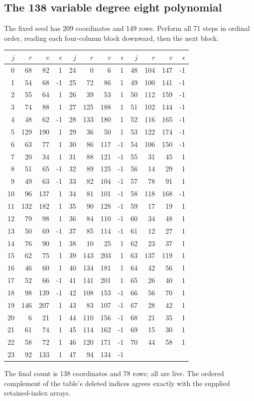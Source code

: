 \subsection{The 138 variable degree eight polynomial}
The fixed seed has 209 coordinates and 149 rows. Perform all 71 steps in ordinal order, reading each four-column block downward, then the next block.
\begin{center}\small\setlength{\tabcolsep}{5pt}
\begin{tabular}{@{}rrrr@{\quad}rrrr@{\quad}rrrr@{}}\toprule
$j$&$r$&$v$&$\epsilon$&$j$&$r$&$v$&$\epsilon$&$j$&$r$&$v$&$\epsilon$\\\midrule
0 & 68 & 82 & 1 & 24 & 0 & 6 & 1 & 48 & 104 & 147 & -1\\
1 & 54 & 68 & -1 & 25 & 72 & 86 & 1 & 49 & 100 & 141 & -1\\
2 & 55 & 64 & 1 & 26 & 39 & 53 & 1 & 50 & 112 & 159 & -1\\
3 & 74 & 88 & 1 & 27 & 125 & 188 & 1 & 51 & 102 & 144 & -1\\
4 & 48 & 62 & -1 & 28 & 133 & 180 & 1 & 52 & 116 & 165 & -1\\
5 & 129 & 190 & 1 & 29 & 36 & 50 & 1 & 53 & 122 & 174 & -1\\
6 & 63 & 77 & 1 & 30 & 86 & 117 & -1 & 54 & 106 & 150 & -1\\
7 & 20 & 34 & 1 & 31 & 88 & 121 & -1 & 55 & 31 & 45 & 1\\
8 & 51 & 65 & -1 & 32 & 89 & 125 & -1 & 56 & 14 & 29 & 1\\
9 & 49 & 63 & -1 & 33 & 82 & 104 & -1 & 57 & 78 & 91 & 1\\
10 & 96 & 137 & 1 & 34 & 81 & 101 & -1 & 58 & 118 & 168 & -1\\
11 & 132 & 182 & 1 & 35 & 90 & 128 & -1 & 59 & 17 & 19 & 1\\
12 & 79 & 98 & 1 & 36 & 84 & 110 & -1 & 60 & 34 & 48 & 1\\
13 & 50 & 69 & -1 & 37 & 85 & 114 & -1 & 61 & 12 & 27 & 1\\
14 & 76 & 90 & 1 & 38 & 10 & 25 & 1 & 62 & 23 & 37 & 1\\
15 & 62 & 75 & 1 & 39 & 143 & 203 & 1 & 63 & 137 & 119 & 1\\
16 & 46 & 60 & 1 & 40 & 134 & 181 & 1 & 64 & 42 & 56 & 1\\
17 & 52 & 66 & -1 & 41 & 141 & 201 & 1 & 65 & 26 & 40 & 1\\
18 & 98 & 139 & -1 & 42 & 108 & 153 & -1 & 66 & 56 & 70 & 1\\
19 & 146 & 207 & 1 & 43 & 83 & 107 & -1 & 67 & 28 & 42 & 1\\
20 & 6 & 21 & 1 & 44 & 110 & 156 & -1 & 68 & 21 & 35 & 1\\
21 & 61 & 74 & 1 & 45 & 114 & 162 & -1 & 69 & 15 & 30 & 1\\
22 & 58 & 72 & 1 & 46 & 120 & 171 & -1 & 70 & 44 & 58 & 1\\
23 & 92 & 133 & 1 & 47 & 94 & 134 & -1 &  &  &  & \\
\bottomrule\end{tabular}\end{center}
The final count is 138 coordinates and 78 rows; all are live. The ordered complement of the table's deleted indices agrees exactly with the supplied retained-index arrays.
